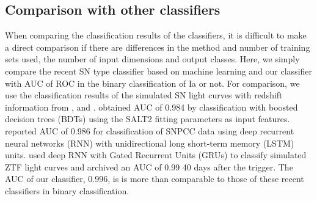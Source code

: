 \documentclass[useamsfonts]{pasj01}
\begin{document}
\subsection{Comparison with other classifiers}
%
When comparing the classification results of the classifiers, it is difficult to make a direct comparison if there are differences in the method and number of training sets used, the number of input dimensions and output classes. 
Here, we simply compare the recent SN type classifier based on machine learning and our classifier with AUC of ROC in the binary classification of Ia or not.
For comparison, we use the classification results of the simulated SN light curves with redshift information from \citet{Lochner_2016}, \citet{charnock17a} and \citet{Muthukrishna_2019}.
\citet{Lochner_2016} obtained AUC of 0.984 by classification with boosted decision trees (BDTs) using the SALT2 fitting parameters as input features.
\citet{charnock17a} reported AUC of 0.986 for classification of SNPCC data using deep recurrent neural networks (RNN) with unidirectional long short-term memory (LSTM) units.
\citet{Muthukrishna_2019} used deep RNN with Gated Recurrent Units (GRUs) to classify simulated ZTF light curves and archived an AUC of 0.99 40 days after the trigger.
The AUC of our classifier, 0.996, is is more than comparable to those of these recent classifiers in binary classification.
\end{document}
